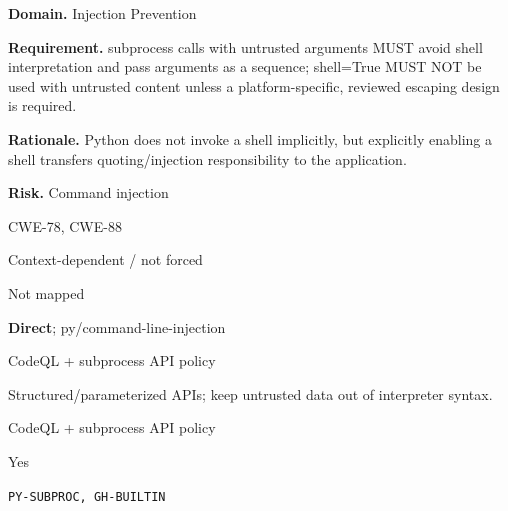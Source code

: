 \documentclass[10pt,letterpaper]{article}
\newcommand{\prioritybadge}[2]{\tcbox[on line,boxrule=0pt,arc=1.2mm,boxsep=0.7mm,left=1mm,right=1mm,top=0.4mm,bottom=0.4mm,colback=#2!12,coltext=#2]{\scriptsize\bfseries #1}}
\begin{document}
\begin{rulebox}[title={\texttt{SCS-PY-INJ-001} \hfill \prioritybadge{Critical Control}{Critical}}]
\textbf{Domain.} Injection Prevention

\textbf{Requirement.} subprocess calls with untrusted arguments MUST avoid shell interpretation and pass arguments as a sequence; shell=True MUST NOT be used with untrusted content unless a platform-specific, reviewed escaping design is required.

\textbf{Rationale.} Python does not invoke a shell implicitly, but explicitly enabling a shell transfers quoting/injection responsibility to the application.

\textbf{Risk.} Command injection

\begin{description}[leftmargin=2.65cm,labelwidth=2.3cm,style=nextline,itemsep=1pt,topsep=3pt]
  \item[CWE] CWE-78, CWE-88
  \item[OWASP] Context-dependent / not forced
  \item[CERT] Not mapped
  \item[CodeQL] \textbf{Direct}; py/command-line-injection
  \item[Enforcement] CodeQL + subprocess API policy
  \item[Prevention] Structured/parameterized APIs; keep untrusted data out of interpreter syntax.
  \item[Verification] CodeQL + subprocess API policy
  \item[Automation] Yes
  \item[Sources] \texttt{PY-SUBPROC, GH-BUILTIN}
\end{description}
\end{rulebox}
\end{document}
